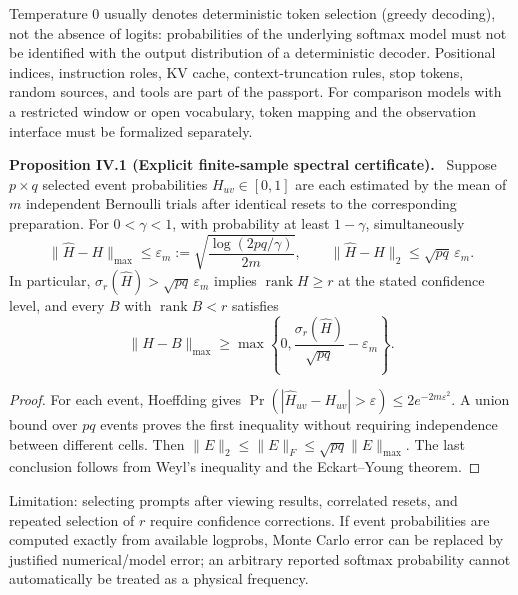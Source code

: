 \documentclass[11pt,a4paper,oneside]{book}
\DeclareMathOperator{\rank}{rank}\DeclareMathOperator{\Tr}{Tr}
\newcommand{\statement}[3]{\par\medskip\noindent\textbf{#1 #2 (#3).}\ }
\begin{document}
Temperature 0 usually denotes deterministic token selection (greedy decoding), not the absence of logits: probabilities of the underlying softmax model must not be identified with the output distribution of a deterministic decoder. Positional indices, instruction roles, KV cache, context-truncation rules, stop tokens, random sources, and tools are part of the passport. For comparison models with a restricted window or open vocabulary, token mapping and the observation interface must be formalized separately.
\statement{Proposition}{IV.1}{Explicit finite-sample spectral certificate} Suppose $p\times q$ selected event probabilities $H_{uv}\in[0,1]$ are each estimated by the mean of $m$ independent Bernoulli trials after identical resets to the corresponding preparation. For $0<\gamma<1$, with probability at least $1-\gamma$, simultaneously
\begin{equation}\|\widehat H-H\|_{\max}\le\varepsilon_m:=\sqrt{\frac{\log(2pq/\gamma)}{2m}},\qquad\|\widehat H-H\|_2\le\sqrt{pq}\,\varepsilon_m.\tag{30}\end{equation}
In particular, $\sigma_r(\widehat H)>\sqrt{pq}\,\varepsilon_m$ implies $\rank H\ge r$ at the stated confidence level, and every $B$ with $\rank B<r$ satisfies
\begin{equation}\|H-B\|_{\max}\ge\max\left\{0,\frac{\sigma_r(\widehat H)}{\sqrt{pq}}-\varepsilon_m\right\}.\tag{31}\end{equation}
\begin{proof}For each event, Hoeffding gives $\Pr(|\widehat H_{uv}-H_{uv}|>\varepsilon)\le2e^{-2m\varepsilon^2}$. A union bound over $pq$ events proves the first inequality without requiring independence between different cells. Then $\|E\|_2\le\|E\|_F\le\sqrt{pq}\|E\|_{\max}$. The last conclusion follows from Weyl's inequality and the Eckart--Young theorem.\end{proof}
Limitation: selecting prompts after viewing results, correlated resets, and repeated selection of $r$ require confidence corrections. If event probabilities are computed exactly from available logprobs, Monte Carlo error can be replaced by justified numerical/model error; an arbitrary reported softmax probability cannot automatically be treated as a physical frequency.
\end{document}
